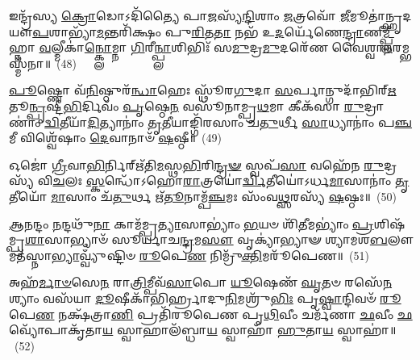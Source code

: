 {\anuvakamend[{}]}%

𑌇𑌨𑍍𑌦𑍍𑌰᳴𑌸𑍍𑌯 \ul{𑌕𑍍𑌰𑍋}\-𑌡𑍋\-𑌽𑌦𑌿᳴𑌤𑍍𑌯𑍈 𑌪𑌾\-\ul{𑌜}\-𑌸𑍍𑌯᳴\-\ul{𑌨𑍍𑌦𑌿}\-𑌶𑌾𑌂 \ul{𑌜}\-𑌤𑍍𑌰𑌵𑍋᳴ \ul{𑌜𑍀}\-𑌮𑍂𑌤𑌾॑𑌨𑍍𑌹𑍃𑌦𑌯𑍗\-\ul{𑌪}\-𑌶𑌾𑌭𑍍𑌯𑌾᳴\-\ul{𑌮}\-𑌨𑍍𑌤𑌰𑌿᳴𑌕𑍍𑌷𑌂 𑌪𑍁\-\ul{𑌰𑌿}\-𑌤\-\ul{𑌤𑌾} 𑌨𑌭᳴ 𑌉\-\ul{𑌦}\-𑌰𑍍𑌯𑍇᳴𑌣𑍇\-\ul{𑌨𑍍𑌦𑍍𑌰𑌾}\-𑌣𑍀\-\ul{𑌮𑍍𑌪𑍍𑌲𑍀}\-𑌹𑍍𑌨𑌾 \ul{𑌵}\-𑌲𑍍𑌮𑍀𑌕𑌾॑\-\ul{𑌨𑍍𑌕𑍍𑌲𑍋}\-𑌮𑍍𑌨𑌾 \ul{𑌗𑌿}\-𑌰𑍀\-\ul{𑌨𑍍𑌪𑍍𑌲𑌾}\-𑌶𑌿𑌭𑌿𑌃᳴ 𑌸\-\ul{𑌮𑍁}\-𑌦𑍍𑌰\-\ul{𑌮𑍁}\-𑌦𑌰𑍇᳴𑌣 𑌵𑍈𑌶𑍍𑌵𑌾\-\ul{𑌨}\-𑌰𑌮𑍍𑌭𑌸𑍍𑌮᳴𑌨𑌾॥~(48)

{\anuvakamend[{\-\ul{𑌮𑌿}\-𑌤𑍍𑌰𑌾𑌵𑌰𑍁᳴\-\ul{𑌣𑌾}\-𑌵𑌿𑌨𑍍𑌦𑍍𑌰᳴\-\ul{𑌸𑍍𑌯} 𑌦𑍍𑌵𑌾𑌵𑌿𑍞᳴𑌶\-\ul{𑌤𑌿}\-𑌰𑍍𑌦𑍍𑌵𑌾𑌵𑌿𑍞᳴𑌶𑌤𑌿𑌃}]}%

\-\ul{𑌪𑍂}\-𑌷𑍍𑌣𑍋 𑌵᳴\-\ul{𑌨𑌿}\-𑌷𑍍𑌠𑍁𑌰᳴\-\ul{𑌨𑍍𑌧𑌾}\-𑌹𑍇𑌃 𑌸𑍍𑌥𑍂᳴𑌰\-\ul{𑌗𑍁}\-𑌦𑌾 \ul{𑌸}\-𑌰𑍍𑌪𑌾𑌨𑍍𑌗𑍁𑌦𑌾᳴𑌭𑌿𑌰𑍍\mbox{}\-\ul{𑌋}\-𑌤𑍂\-\ul{𑌨𑍍𑌪𑍃}\-𑌷𑍍𑌟𑍀\-\ul{𑌭𑌿}\-𑌰𑍍𑌦𑌿𑌵𑌂᳴ \ul{𑌪𑍃}\-𑌷𑍍𑌠𑍇\-\ul{𑌨} 𑌵𑌸𑍂᳴𑌨𑌾𑌮𑍍𑌪𑍍𑌰\-\ul{𑌥}\-𑌮𑌾 𑌕𑍀𑌕᳴𑌸𑌾 \ul{𑌰𑍁}\-𑌦𑍍𑌰𑌾𑌣𑌾𑌂॑ \ul{𑌦𑍍𑌵𑌿}\-𑌤𑍀𑌯𑌾᳴\-\ul{𑌦𑌿}\-𑌤𑍍𑌯𑌾𑌨𑌾𑌂॑ \ul{𑌤𑍃}\-𑌤𑍀𑌯𑌾𑌙𑍍𑌗𑌿᳴𑌰𑌸𑌾𑌂 𑌚\-\ul{𑌤𑍁}\-𑌰𑍍𑌥𑍀 \ul{𑌸𑌾}\-𑌧𑍍𑌯𑌾𑌨𑌾𑌂॑ 𑌪\-\ul{𑌞𑍍𑌚}\-𑌮𑍀 𑌵𑌿𑌶𑍍𑌵𑍇᳴𑌷𑌾𑌂 \ul{𑌦𑍇}\-𑌵𑌾𑌨𑌾𑍞᳴ \ul{𑌷}\-𑌷𑍍𑌠𑍀॥~(49)

{\anuvakamend[{\-\ul{𑌪𑍂}\-𑌷𑍍𑌣𑌶𑍍𑌚𑌤𑍁᳴𑌰𑍍𑌵𑌿𑍞𑌶𑌤𑌿𑌃}]}%

𑌓𑌜𑍋॑ \ul{𑌗𑍍𑌰𑍀}\-𑌵𑌾\-\ul{𑌭𑌿}\-𑌰𑍍𑌨𑌿𑌰𑍍\mbox{}𑌋᳴𑌤𑌿\-\ul{𑌮}\-𑌸𑍍𑌥\-\ul{𑌭𑌿}\-𑌰𑌿\-\ul{𑌨𑍍𑌦𑍍𑌰}\-\-\ul{𑍟} 𑌸𑍍𑌵𑌪᳴\-\ul{𑌸𑌾} 𑌵𑌹𑍇᳴𑌨 \ul{𑌰𑍁}\-𑌦𑍍𑌰𑌸𑍍𑌯᳴ 𑌵𑌿\-\ul{𑌚}\-𑌲𑌃 \ul{𑌸𑍍𑌕}\-𑌨𑍍𑌧𑍋᳴\-𑌽𑌹𑍋\-\ul{𑌰𑌾}\-𑌤𑍍𑌰𑌯𑍋॑\-\ul{𑌰𑍍𑌦𑍍𑌵𑌿}\-𑌤𑍀𑌯𑍋॑\-𑌽𑌰𑍍𑌧\-\ul{𑌮𑌾}\-𑌸𑌾𑌨𑌾𑌂॑ \ul{𑌤𑍃}\-𑌤𑍀𑌯𑍋᳴ \ul{𑌮𑌾}\-𑌸𑌾𑌂 𑌚᳴\-\ul{𑌤𑍁}\-𑌰𑍍𑌥 𑌋᳴\-\ul{𑌤𑍂}\-𑌨𑌾𑌮𑍍𑌪᳴\-\ul{𑌞𑍍𑌚}\-𑌮𑌃 𑌸𑌂᳴𑌵\-\ul{𑌥𑍍𑌸}\-𑌰𑌸𑍍𑌯᳴ \ul{𑌷}\-𑌷𑍍𑌠𑌃॥~(50)

{\anuvakamend[{𑌓𑌜𑍋᳴ 𑌵𑌿𑍞\-\ul{𑌶}\-𑌤𑌿𑌃}]}%

\-\ul{𑌆}\-\-\ul{𑌨}\-𑌨𑍍𑌦𑌂 \ul{𑌨}\-𑌨𑍍𑌦𑌥𑍁᳴\-\ul{𑌨𑌾} 𑌕𑌾𑌮᳴𑌮𑍍𑌪𑍍𑌰\-\ul{𑌤𑍍𑌯𑌾}\-𑌸𑌾\-𑌭𑍍𑌯𑌾𑌂॑ \ul{𑌭}\-𑌯𑍞 𑌶𑌿᳴\-\ul{𑌤𑍀}\-𑌮\-𑌭𑍍𑌯𑌾𑌂॑ \ul{𑌪𑍍𑌰}\-𑌶𑌿𑌷᳴𑌮𑍍𑌪𑍍𑌰\-\ul{𑌶𑌾}\-𑌸𑌾𑌭𑍍𑌯𑌾𑍞᳴ 𑌸𑍂𑌰𑍍𑌯𑌾𑌚\-\ul{𑌨𑍍𑌦𑍍𑌰}\-𑌮\-\ul{𑌸𑍗} 𑌵𑍃𑌕𑍍𑌯𑌾॑𑌭𑍍𑌯𑌾𑍟 𑌶𑍍𑌯𑌾𑌮𑌶\-\ul{𑌬}\-𑌲𑍗 𑌮𑌤᳴𑌸𑍍𑌨𑌾\-\ul{𑌭𑍍𑌯𑌾}\-𑌵𑍍𑌵𑍍𑌯𑍁𑌁᳴𑌷𑍍𑌟𑌿𑍞 \ul{𑌰𑍂}\-𑌪𑍇\-\ul{𑌣} 𑌨𑌿𑌮𑍍𑌰𑍁᳴\-\ul{𑌕𑍍𑌤𑌿}\-𑌮𑌰𑍂᳴𑌪𑍇𑌣॥~(51)

{\anuvakamend[{\-\ul{𑌆}\-\-\ul{𑌨}\-𑌨𑍍𑌦𑍞 𑌷𑍋𑌡᳴𑌶}]}%

𑌅𑌹᳴\-\ul{𑌰𑍍𑌮𑌾}\-\-\ul{𑍞}\-𑌸𑍇\-\ul{𑌨} 𑌰𑌾\-\ul{𑌤𑍍𑌰𑌿}\-𑌮𑍍𑌪𑍀𑌵᳴\-\ul{𑌸𑌾}\-𑌪𑍋 \ul{𑌯𑍂}\-𑌷𑍇𑌣᳴ \ul{𑌘𑍃}\-𑌤𑍞 𑌰𑌸𑍇᳴\-\ul{𑌨} 𑌶𑍍𑌯𑌾𑌂 𑌵𑌸᳴𑌯𑌾 \ul{𑌦𑍂}\-𑌷𑍀𑌕𑌾᳴𑌭𑌿𑌰𑍍\mbox{}\-\ul{𑌹𑍍𑌰𑌾}\-𑌦𑍁\-\ul{𑌨𑌿}\-𑌮𑌶𑍍𑌰𑍁᳴\-\ul{𑌭𑌿𑌃} 𑌪𑍃\-\ul{𑌷𑍍𑌵𑌾}\-𑌨𑍍𑌦𑌿𑌵𑍞᳴ \ul{𑌰𑍂}\-𑌪𑍇\-\ul{𑌣} 𑌨𑌕𑍍𑌷᳴𑌤𑍍𑌰𑌾\-\ul{𑌣𑌿} 𑌪𑍍𑌰𑌤𑌿᳴𑌰𑍂𑌪𑍇𑌣 𑌪𑍃\-\ul{𑌥𑌿}\-𑌵𑍀𑌂 𑌚𑌰𑍍𑌮᳴𑌣𑌾 \ul{𑌛}\-𑌵𑍀𑌂 \ul{𑌛}\-𑌵𑍍𑌯𑍋᳴𑌪𑌾𑌕𑍃᳴𑌤𑌾\-\ul{𑌯} 𑌸𑍍𑌵𑌾𑌹𑌾𑌲᳴𑌬𑍍𑌧𑌾\-\ul{𑌯} 𑌸𑍍𑌵𑌾𑌹𑌾᳴ \ul{𑌹𑍁}\-𑌤𑌾\-\ul{𑌯} 𑌸𑍍𑌵𑌾𑌹𑌾॑॥~(52)

{\anuvakamend[{𑌅𑌹᳴\-\ul{𑌰}\-𑌷𑍍𑌟𑌾𑌵𑌿𑍞᳴𑌶𑌤𑌿𑌃}]}%

